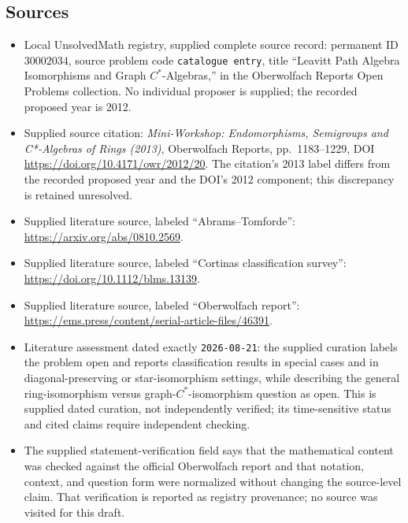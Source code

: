 \documentclass[11pt]{article}
\begin{document}
\subsection{Sources}
\begin{itemize}
\item Local UnsolvedMath registry, supplied complete source record: permanent ID \(30002034\), source problem code \texttt{catalogue entry}, title ``Leavitt Path Algebra Isomorphisms and Graph \(C^*\)-Algebras,'' in the Oberwolfach Reports Open Problems collection. No individual proposer is supplied; the recorded proposed year is 2012.
\item Supplied source citation: \emph{Mini-Workshop: Endomorphisms, Semigroups and C*-Algebras of Rings (2013)}, Oberwolfach Reports, pp.~1183--1229, DOI \url{https://doi.org/10.4171/owr/2012/20}. The citation's 2013 label differs from the recorded proposed year and the DOI's 2012 component; this discrepancy is retained unresolved.
\item Supplied literature source, labeled ``Abrams--Tomforde'': \url{https://arxiv.org/abs/0810.2569}.
\item Supplied literature source, labeled ``Cortinas classification survey'': \url{https://doi.org/10.1112/blms.13139}.
\item Supplied literature source, labeled ``Oberwolfach report'': \url{https://ems.press/content/serial-article-files/46391}.
\item Literature assessment dated exactly \texttt{2026-08-21}: the supplied curation labels the problem open and reports classification results in special cases and in diagonal-preserving or star-isomorphism settings, while describing the general ring-isomorphism versus graph-\(C^*\)-isomorphism question as open. This is supplied dated curation, not independently verified; its time-sensitive status and cited claims require independent checking.
\item The supplied statement-verification field says that the mathematical content was checked against the official Oberwolfach report and that notation, context, and question form were normalized without changing the source-level claim. That verification is reported as registry provenance; no source was visited for this draft.
\end{itemize}
\end{document}
